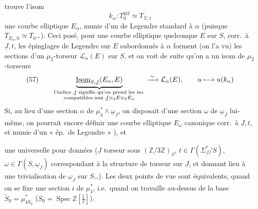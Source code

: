 \documentclass[11pt,a4paper]{article}
\begin{document}
trouve l'isom
\[
  k_\alpha : T_0^{\otimes 2} \simeq T_{\Sigma,t}
\]
 une courbe elliptique $E_\alpha$, munie d'un
\struck{\ill{}}  de Legendre standard  à
$\alpha$ (puisque $T_{E_\alpha,0} \simeq T_0$\ldots). Ceci posé, pour une courbe
elliptique quelconque $E$ sur $S$, corr.\ à $\underline{J}, t$, les
épinglages de Legendre sur $E$ subordonnés à $\alpha$ forment (on l'a vu) les
sections d'un $\mu_2$-torseur $\mathcal{L}_\alpha(E)$ sur $S$, et on voit de
suite qu'on a un isom de $\mu_2$-torseurs
\[
  \text{(57)} \qquad
  \underbrace{\underline{\mathrm{Isom}}_{S,\underline{J}}(E_\alpha, E)}_{%
    \substack{\text{l'indice } \underline{J} \text{ signifie qu'on prend les iso.}\\
    \text{compatibles aux } \underline{J} \simeq {}_2E \simeq {}_2E_\alpha}}
  \xrightarrow{\;\sim\;} \mathcal{L}_\alpha(E),
  \qquad u \longmapsto u(k_\alpha)
\]
Si, au lieu d'une section $\alpha$ de
$\mu_4^{*} \wedge \underline{\omega}_{\underline{J}}$, on disposait d'une
section $\omega$ de $\underline{\omega}_{\underline{J}}$ lui-même, on pourrait
encore définir une courbe elliptique $E_\omega$ canonique corr.\ à
$\underline{J}, t$, et munie d'un « ép.\ de Legendre  »
), et

 une  universelle pour \struck{\ill{}}
 données ($\underline{J}$ torseur sous
$(\mathbb{Z}/3\mathbb{Z})_S$, $t \in \Gamma(\Sigma_{\underline{J}}^{*}/S)$,
$\omega \in \Gamma(S, \underline{\omega}_{\underline{J}})$ correspondant à la
structure de torseur sur $\underline{J}$, et donnant lieu à une
trivialisation de $\underline{\omega}_{\underline{J}}$ sur $S$\ldots). Les
deux points de vue sont équivalents, quand on se fixe une section $i$ de
$\mu_4^{*}$, i.e.\ quand on travaille au-dessus de la base
$\widetilde{S}_0 = \mu_{4S_0}^{*}$ ($S_0 = \operatorname{Spec} \mathbb{Z}[\tfrac{1}{2}]$).
\end{document}
